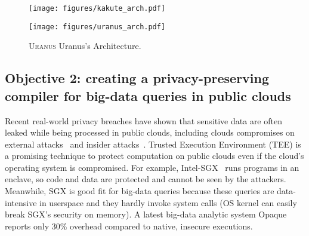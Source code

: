 \documentclass{article}
\newcommand{\kakute}[0]{\textsc{Kakute}\xspace}
\newcommand{\maat}[0]{\textsc{Uranus}\xspace}
\newcommand{\eg}{{e.g.}}
\begin{document}
\begin{figure}[h]
    \centering
    \begin{minipage}{0.40\textwidth}
        \vspace{-.1in}
        \texttt{[image: figures/kakute\_arch.pdf]}
         \vspace{-.4in}
        \caption{\kakute architecture. \kakute's key components are shaded 
(and in blue).}
        \label{fig:falcon-protocol}
   \end{minipage}
    \hspace{.1in}
    \centering
    \begin{minipage}{0.48\textwidth}
        \vspace{-.1in}
       \texttt{[image: figures/uranus\_arch.pdf]}
        \vspace{-.1in}
       \caption{\maat Uranus's Architecture.}
       \label{fig:maat-arch}
    \end{minipage}
\end{figure}

\subsection{Objective 2: creating a privacy-preserving compiler 
for big-data queries in public clouds}\label{sec:obj2}\vspace{-.075in}


Recent real-world privacy breaches have shown that sensitive data are often 
leaked while being processed in public clouds, including clouds 
compromises on external attacks~\cite{icloud-breach} and 
insider attacks~\cite{top-threats}. Trusted Execution Environment 
(TEE) is a promising technique to protect computation on public clouds even if 
the cloud's operating system is compromised. For example, 
Intel-SGX~\cite{intel-sgx} runs programs in an enclave, so code and data are 
protected and cannot be seen by the attackers. Meanwhile, SGX is good fit for 
big-data queries because these queries are data-intensive in userspace and they 
hardly invoke system calls (OS kernel can easily break SGX's security on 
memory). A latest big-data analytic system Opaque~\cite{opaque:nsdi17} reports 
only 30\% overhead compared to native, insecure executions.
\end{document}

